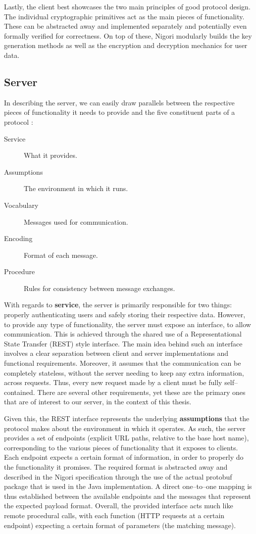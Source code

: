 Lastly, the client best showcases the two main principles of good protocol design.
The individual cryptographic primitives act as the main pieces of functionality.
These can be abstracted away and implemented separately and potentially even formally verified for correctness.
On top of these, Nigori modularly builds the key generation methods as well as the encryption and decryption mechanics for user data.

\subsection{Server}
In describing the server, we can easily draw parallels between the respective pieces of functionality it needs to provide and the five constituent parts of a protocol \cite{ProtocolDesign}:
\begin{description}
  \item[Service] What it provides.
  \item[Assumptions] The environment in which it runs.
  \item[Vocabulary] Messages used for communication.
  \item[Encoding] Format of each message.
  \item[Procedure] Rules for consistency between message exchanges.
\end{description}

With regards to \textbf{service}, the server is primarily responsible for two things: properly authenticating users and safely storing their respective data.
However, to provide any type of functionality, the server must expose an interface, to allow communication.
This is achieved through the shared use of a Representational State Transfer (REST) \cite{REST} style interface.
The main idea behind such an interface involves a clear separation between client and server implementations and functional requirements.
Moreover, it assumes that the communication can be completely stateless, without the server needing to keep any extra information, across requests.
Thus, every new request made by a client must be fully self--contained.
There are several other requirements, yet these are the primary ones that are of interest to our server, in the context of this thesis.

Given this, the REST interface represents the underlying \textbf{assumptions} that the protocol makes about the environment in which it operates.
As such, the server provides a set of endpoints (explicit URL paths, relative to the base host name), corresponding to the various pieces of functionality that it exposes to clients.
Each endpoint expects a certain format of information, in order to properly do the functionality it promises.
The required format is abstracted away and described in the Nigori specification through the use of the actual protobuf \cite{protobuf} package that is used in the Java implementation.
A direct one--to--one mapping is thus established between the available endpoints and the messages that represent the expected payload format.
Overall, the provided interface acts much like remote procedural calls, with each function (HTTP requests at a certain endpoint) expecting a certain format of parameters (the matching message).

